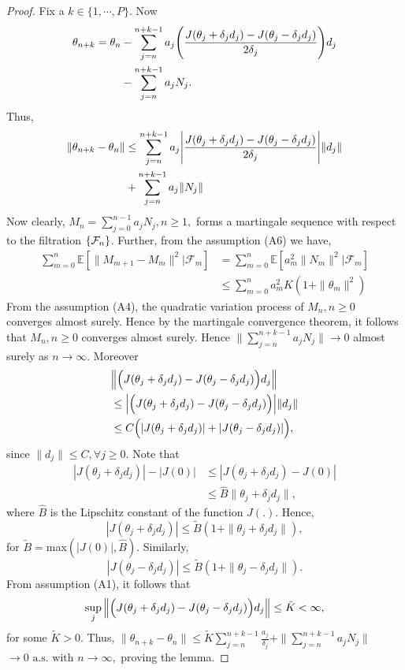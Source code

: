 \begin{proof}
 Fix a $k \in \{1,\cdots,P \}.$ Now
 \begin{align*}
 \begin{split}
 \theta_{n+k} = \theta_n & -\sum_{j=n}^{n+k-1}a_j\Bigg{(}\frac{J(\theta_j+\delta_j d_j)-J(\theta_j-\delta_j d_j)}{2\delta_j}\Bigg{)}d_j \\ 
  &-\sum_{j=n}^{n+k-1}a_jN_{j}.
 \end{split}
 \end{align*}
 Thus,
 \begin{align*}
 \begin{split}
 \|\theta_{n+k}-\theta_n\| &\leq \sum_{j=n}^{n+k-1}a_j\Bigg{|}\frac{J(\theta_j+\delta_{j} d_j)-J(\theta_j-\delta_{j} d_j)}{2\delta_j}\Bigg{|}\|d_j\|\\
 &+\sum_{j=n}^{n+k-1}a_j\|N_{j}\|
\end{split}
\end{align*}
Now clearly,
$M_n=\sum\limits_{j=0}^{n-1}a_jN_{j}, n\geq1,$
forms a martingale sequence with respect to the filtration $\{\mathcal{F}_n\}$.
Further, from the assumption (A6) we have,
\begin{align*}
\sum_{m=0}^{n}\mathbb{E}[\|M_{m+1}-M_{m}\|^2|\mathcal{F}_{m}]& =\sum_{m=0}^{n}\mathbb{E}[a_{m}^2\|N_{m}\|^2|\mathcal{F}_{m}]\\
& \leq \sum_{m=0}^{n}a_{m}^2K(1+\|\theta_m\|^2)
\end{align*}
From the assumption (A4), the quadratic variation process of $M_n,n\geq0$ converges 
almost surely. Hence by the martingale convergence theorem, it follows that 
$M_n, n\geq0$ converges almost surely. Hence
$\|\sum\limits_{j=n}^{n+k-1}a_jN_{j}\|\rightarrow 0$ almost surely as $n\rightarrow \infty.$
Moreover
\begin{align*}
&\Big{\|}\Big{(}J(\theta_j+\delta_j d_j)-J(\theta_j-\delta_j d_j)\Big{)}d_j\Big{\|} \\
& \leq \Big{|}\Big{(}J(\theta_j+\delta_j d_j)-J(\theta_j-\delta_j d_j)\Big{)}\Big{|}\|d_j\|\\
& \leq C \Big{(}|J(\theta_j+\delta_j d_j)|+|J(\theta_j-\delta_j d_j)|\Big{)},
\end{align*}
since $\|d_j\|\leq C, \forall j \geq0.$
Note that
\begin{align*}
|J(\theta_j+\delta_j d_j)|-|J(0)| & \leq|J(\theta_j+\delta_j d_j)-J(0)| \\
& \leq \hat{B} \|\theta_j+\delta_j d_j\|,
\end{align*}
where $\hat{B}$ is the Lipschitz constant of the function $J(.).$ Hence,
$$|J(\theta_j+\delta_j d_j)|\leq \tilde{B}(1+\|\theta_j+\delta_j d_j\|),$$
for $\tilde{B}=$max$(|J(0)|,\hat{B}).$ Similarly,
$$|J(\theta_j-\delta_j d_j)|\leq \tilde{B}(1+\|\theta_j-\delta_j d_j\|).$$
From assumption (A1), it follows that
$$\sup_j\Big{\|}\Big{(}J(\theta_j+\delta_j d_j)-J(\theta_j-\delta_j d_j)\Big{)}d_j\Big{\|}\leq \tilde{K}<\infty,$$
for some $\tilde{K}>0.$ Thus,
\newline
$\|\theta_{n+k}-\theta_n\| \leq \tilde{K}\sum\limits_{j=n}^{n+k-1}\frac{a_j}{\delta_j}+\|\sum_{j=n}^{n+k-1}a_jN_{j}\|$
\newline
$\rightarrow 0 \text{ a.s. with } n \rightarrow \infty,$
proving the lemma.
\end{proof}
